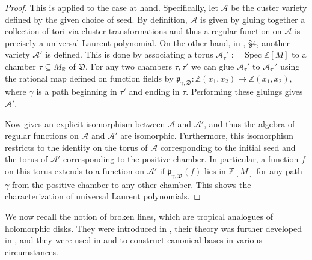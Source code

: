 \documentclass[11pt]{amsart}
\theoremstyle{remark}
\numberwithin{equation}{section}
\newcommand{\RR}{\mathbb{R}}
\newcommand{\ZZ}{\mathbb{Z}}
\newcommand{\cA}{\mathcal{A}}
\newcommand{\fD}{\mathfrak{D}}
\newcommand{\fp}{\mathfrak{p}}
\newcommand{\Spec}{\operatorname{Spec}}
\begin{document}
\begin{proof}
  This is \cite[Theorem 4.4]{GHKK} applied to the case at hand.
  Specifically, let $\cA$ be the custer variety defined by the given choice of
  seed. By definition, $\cA$ is given by gluing together a collection of tori
  via cluster transformations and thus a regular function on $\cA$ is precisely a
  universal Laurent polynomial.  On the other hand, in
  \cite{GHKK}, \S 4, another variety $\cA'$ is defined. This is done by
  associating a torus $\cA_{\tau}':= \Spec \ZZ[M]$ to a chamber $\tau\subseteq
  M_{\RR}$ of $\fD$. For any two chambers $\tau,\tau'$ we can glue $\cA_{\tau}'$
  to $\cA_{\tau'}'$ using the rational map defined on function fields by
  $\fp_{\gamma,\fD}:\ZZ(x_1,x_2)\rightarrow \ZZ(x_1,x_2)$, where $\gamma$
  is a path beginning in $\tau'$ and ending in $\tau$. Performing these gluings
  gives $\cA'$.

  Now \cite[Theorem 4.4]{GHKK} gives an explicit isomorphism between $\cA$ and
  $\cA'$, and thus the algebra of regular functions on $\cA$ and $\cA'$ are
  isomorphic. Furthermore, this isomorphism restricts to the identity on the
  torus of $\cA$ corresponding to the initial seed and the torus of $\cA'$
  corresponding to the positive chamber. In particular, a function $f$ on this
  torus extends to a function on $\cA'$ if $\fp_{\gamma,\fD}(f)$ lies in
  $\ZZ[M]$ for any path $\gamma$ from the positive chamber to any other
  chamber. This shows the characterization of universal Laurent polynomials.
\end{proof}

We now recall the notion of broken lines, which are tropical analogues of holomorphic disks.  They were introduced in \cite{G10}, their theory was further developed in \cite{CPS}, and they were
used in \cite{GHK11} and \cite{GHKK} to construct canonical bases in various
circumstances.
\end{document}

